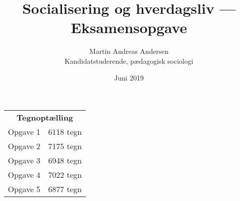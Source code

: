 \documentclass[a4paper]{article}
\author{Martin Andreas Andersen \\ Kandidatstuderende, pædagogisk sociologi}
\title{Socialisering og hverdagsliv --- Eksamensopgave }
\date{Juni 2019}
\begin{document}
\pagestyle{fancy}

\renewcommand{\headrulewidth}{0pt}
\fancyhead[L]{}

\maketitle

\newpage
\tableofcontents

\begin{table*}[bp]
\centering 
  \begin{tabular}{lr}
    \multicolumn{2}{c}{\textbf{Tegnoptælling}} \\
      Opgave 1 & 6118 tegn \\
      Opgave 2 & 7175 tegn \\
      Opgave 3 & 6948 tegn \\
      Opgave 4 & 7022 tegn \\
      Opgave 5 & 6877 tegn \\
  \end{tabular}
\end{table*}

\newpage
 
\newpage

\newpage
 
\newpage

\newpage

\newpage

\end{document}
